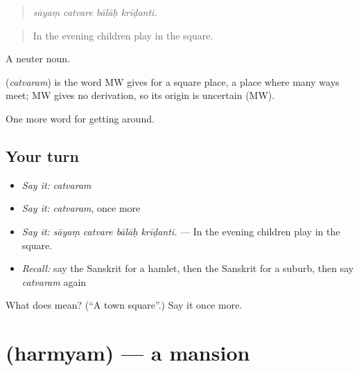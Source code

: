 \begin{quote}
   
\end{quote}

\begin{quote}
\emph{sāyaṃ catvare bālāḥ krīḍanti.}
\end{quote}

\begin{quote}
In the evening children play in the square.
\end{quote}

A neuter noun.

\begin{cousinweb}
\textbf{} (\emph{catvaram}) is the word MW gives for a square place, a place where many ways meet; MW gives no derivation, so its origin is uncertain (MW).
\end{cousinweb}

\begin{grammarlens}[title={What you've built}]
One more word for getting around.
\end{grammarlens}

\subsection*{Your turn}
\begin{itemize}
\raggedright
  \item \emph{Say it:} \emph{catvaram}
  \item \emph{Say it:} \emph{catvaram}, once more
  \item \emph{Say it:} \emph{sāyaṃ catvare bālāḥ krīḍanti.} — In the evening children play in the square.
  \item \emph{Recall:} say the Sanskrit for a hamlet, then the Sanskrit for a suburb, then say \emph{catvaram} again
\end{itemize}

\begin{tcolorbox}[breakable,colback=teal!4,colframe=teal!35!black,title={Before you move on}]
What does  mean? (\textquotedblleft{}A town square\textquotedblright{}.) Say it once more.
\end{tcolorbox}
\section[\texorpdfstring{\sk{हर्म्यम्} (harmyam)}{हर्म्यम् (harmyam)}]{ (harmyam) — a mansion}

\label{lesson:SA-C421-harmyam}



